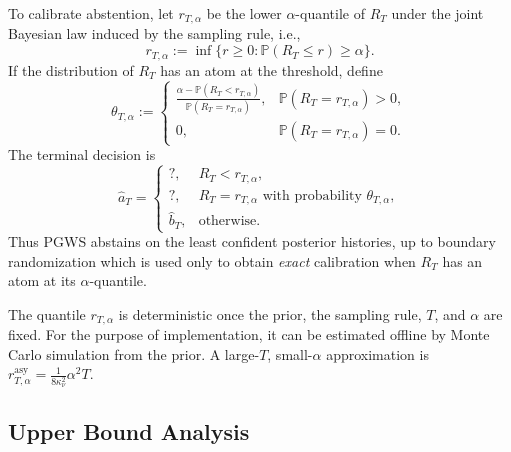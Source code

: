\documentclass[10pt]{article}
\newcommand{\ouralg}{{\textnormal{\textsc{PGWS}}}}
\theoremstyle{plain}
\begin{document}
To calibrate abstention, let \(r_{T,\alpha}\) be the lower
\(\alpha\)-quantile of \(R_T\) under the joint Bayesian law induced by the
sampling rule, i.e., 
\begin{equation}
\label{equ:terminal_threshold}
    r_{T,\alpha}
    :=
    \inf\bigl\{
        r\ge 0:
        \mathbb P(R_T\le r)\ge \alpha
    \bigr\}.
\end{equation}
If the distribution of \(R_T\) has an atom at the
threshold, define
\begin{equation}
\label{eq:pgws-boundary-randomization}
    \theta_{T,\alpha}
    :=
    \begin{cases}
    \displaystyle
    \frac{
        \alpha-\mathbb P(R_T<r_{T,\alpha})
    }{
        \mathbb P(R_T=r_{T,\alpha})
    },
    & \mathbb P(R_T=r_{T,\alpha})>0,\\ 
    0,
    & \mathbb P(R_T=r_{T,\alpha})=0.
    \end{cases}
\end{equation}
The terminal decision is
\begin{equation}
\label{eq:pgws-terminal-rule}
    \hat a_T
    =
    \begin{cases}
        ?, & R_T<r_{T,\alpha},\\
        ?, & R_T=r_{T,\alpha}
             \text{ with probability } \theta_{T,\alpha},\\
        \widehat b_T, & \text{otherwise}.
    \end{cases}
\end{equation}
Thus \ouralg{} abstains on the least confident posterior histories, up to boundary randomization which is used only to obtain
{\em exact} calibration when \(R_T\) has an atom at its \(\alpha\)-quantile.

\begin{remark}
\label{rem:pgws-threshold}
The quantile \(r_{T,\alpha}\) is deterministic once the prior, the sampling
rule, \(T\), and \(\alpha\) are fixed. For the purpose of implementation, it can be estimated
offline by Monte Carlo simulation from the prior. A    
large-\(T\), small-\(\alpha\) approximation is
$
    r_{T,\alpha}^{\mathrm{asy}}
    =
    \frac{1}{8\kappa_\nu^2}\alpha^2T .
$
\end{remark}




\subsection{Upper Bound Analysis}
\label{subsec:pgws-upper-analysis}
\end{document}
